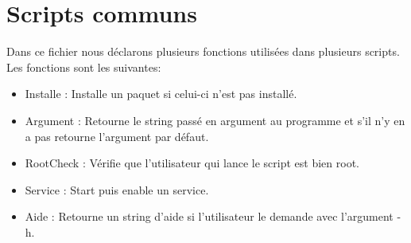 \section{Scripts communs}

Dans ce fichier nous déclarons plusieurs fonctions utilisées dans plusieurs scripts. Les fonctions sont les suivantes:
\begin{itemize}
	\item Installe : Installe un paquet si celui-ci n'est pas installé.
	\item Argument : Retourne le string passé en argument au programme et s'il n'y en a pas retourne l'argument par défaut.
	\item RootCheck : Vérifie que l'utilisateur qui lance le script est bien root.
	\item Service : Start puis enable un service.
	\item Aide : Retourne un string d'aide si l'utilisateur le demande avec l'argument -h.
\end{itemize}
